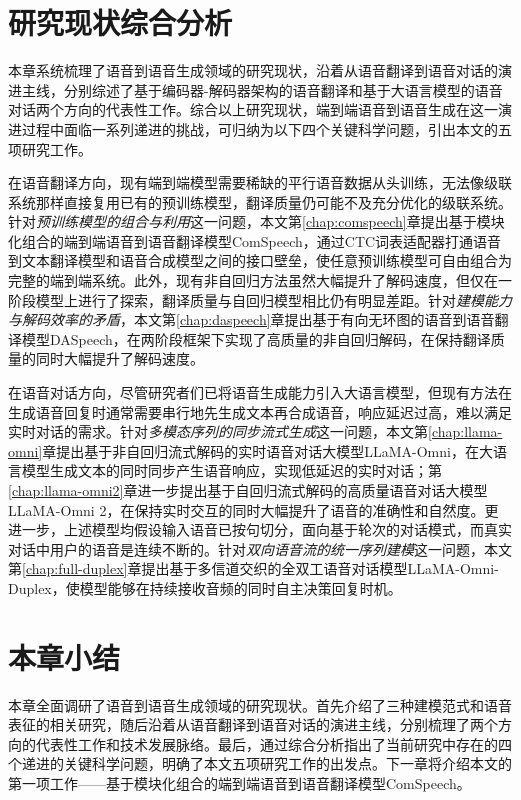 \section{研究现状综合分析}\label{sec:rw_analysis}

本章系统梳理了语音到语音生成领域的研究现状，沿着从语音翻译到语音对话的演进主线，分别综述了基于编码器-解码器架构的语音翻译和基于大语言模型的语音对话两个方向的代表性工作。综合以上研究现状，端到端语音到语音生成在这一演进过程中面临一系列递进的挑战，可归纳为以下四个关键科学问题，引出本文的五项研究工作。

在语音翻译方向，现有端到端模型需要稀缺的平行语音数据从头训练，无法像级联系统那样直接复用已有的预训练模型，翻译质量仍可能不及充分优化的级联系统。针对\textit{预训练模型的组合与利用}这一问题，本文第\ref{chap:comspeech}章提出基于模块化组合的端到端语音到语音翻译模型ComSpeech，通过CTC词表适配器打通语音到文本翻译模型和语音合成模型之间的接口壁垒，使任意预训练模型可自由组合为完整的端到端系统。此外，现有非自回归方法虽然大幅提升了解码速度，但仅在一阶段模型上进行了探索，翻译质量与自回归模型相比仍有明显差距。针对\textit{建模能力与解码效率的矛盾}，本文第\ref{chap:daspeech}章提出基于有向无环图的语音到语音翻译模型DASpeech，在两阶段框架下实现了高质量的非自回归解码，在保持翻译质量的同时大幅提升了解码速度。

在语音对话方向，尽管研究者们已将语音生成能力引入大语言模型，但现有方法在生成语音回复时通常需要串行地先生成文本再合成语音，响应延迟过高，难以满足实时对话的需求。针对\textit{多模态序列的同步流式生成}这一问题，本文第\ref{chap:llama-omni}章提出基于非自回归流式解码的实时语音对话大模型LLaMA-Omni，在大语言模型生成文本的同时同步产生语音响应，实现低延迟的实时对话；第\ref{chap:llama-omni2}章进一步提出基于自回归流式解码的高质量语音对话大模型LLaMA-Omni 2，在保持实时交互的同时大幅提升了语音的准确性和自然度。更进一步，上述模型均假设输入语音已按句切分，面向基于轮次的对话模式，而真实对话中用户的语音是连续不断的。针对\textit{双向语音流的统一序列建模}这一问题，本文第\ref{chap:full-duplex}章提出基于多信道交织的全双工语音对话模型LLaMA-Omni-Duplex，使模型能够在持续接收音频的同时自主决策回复时机。

\section{本章小结}

本章全面调研了语音到语音生成领域的研究现状。首先介绍了三种建模范式和语音表征的相关研究，随后沿着从语音翻译到语音对话的演进主线，分别梳理了两个方向的代表性工作和技术发展脉络。最后，通过综合分析指出了当前研究中存在的四个递进的关键科学问题，明确了本文五项研究工作的出发点。下一章将介绍本文的第一项工作——基于模块化组合的端到端语音到语音翻译模型ComSpeech。

